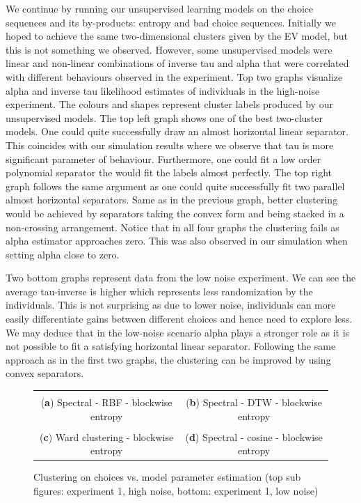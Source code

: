 \documentclass[12pt,a4paper,bibliography=totocnumbered,listof=totocnumbered]{scrartcl}
\begin{document}
We continue by running our unsupervised learning models on the choice sequences and its by-products: entropy and bad choice sequences. Initially we hoped to achieve the same two-dimensional clusters given by the EV model, but this is not something we observed. However, some unsupervised models were linear and non-linear combinations of inverse tau and alpha that were correlated with different behaviours observed in the experiment. Top two graphs visualize alpha and inverse tau likelihood estimates of individuals in the high-noise experiment. The colours and shapes represent cluster labels produced by our unsupervised models. The top left graph shows one of the best two-cluster models. One could quite successfully draw an almost horizontal linear separator. This coincides with our simulation results where we observe that tau is more significant parameter of behaviour. Furthermore, one could fit a low order polynomial separator the would fit the labels almost perfectly. The top right graph follows the same argument as one could quite successfully fit two parallel almost horizontal separators. Same as in the previous graph, better clustering would be achieved by separators taking the convex form and being stacked in a non-crossing arrangement. Notice that in all four graphs the clustering fails as alpha estimator approaches zero. This was also observed in our simulation when setting alpha close to zero.

Two bottom graphs represent data from the low noise experiment. We can see the average tau-inverse is higher which represents less randomization by the individuals. This is not surprising as due to lower noise, individuals can more easily differentiate gains between different choices and hence need to explore less. We may deduce that in the low-noise scenario alpha plays a stronger role as it is not possible to fit a satisfying horizontal linear separator. Following the same approach as in the first two graphs, the clustering can be improved by using convex separators.

\begin{figure}[H]
	\centering
	\small
	\hspace*{-0.7in}
	\begin{tabular}{cc}
		 &  \\
		(\textbf{a}) Spectral - RBF - blockwise entropy & (\textbf{b}) Spectral - DTW - blockwise entropy \\
			 &  \\
			(\textbf{c}) Ward clustering - blockwise entropy & (\textbf{d}) Spectral - cosine - blockwise entropy
	\end{tabular} \quad
	\caption{Clustering on choices vs. model parameter estimation (top sub figures: experiment 1, high noise, bottom: experiment 1, low noise)}
	\label{fig:cluse1c2}
\end{figure}
\end{document}
